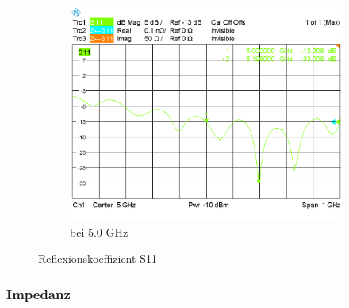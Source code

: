 \begin{figure}[h!]
\begin{center}
\begin{subfigure}[t]{0.49\textwidth}
\begin{center}
				\includegraphics[width=1\textwidth]{../fig/plt/S11_WITH_5_0.PNG}
				\caption{bei 5.0 GHz}
				\label{fig:S11_with_full_5.0}
			\end{center}
		\end{subfigure}
		\caption{Reflexionskoeffizient S11}
		\label{fig:S11_each}
	\end{center}
\end{figure}

\subsubsection{Impedanz}

